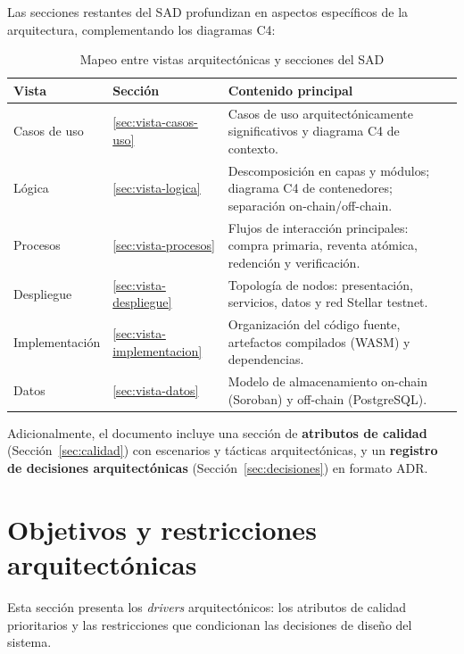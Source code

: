 \documentclass[12pt,oneside]{article}
\begin{document}
Las secciones restantes del SAD profundizan en aspectos específicos de la arquitectura, complementando los diagramas C4:

\begin{table}[htbp]
  \centering
  \begin{tabularx}{\textwidth}{@{}l l X@{}}
    \toprule
    \textbf{Vista} & \textbf{Sección} & \textbf{Contenido principal}\\
    \midrule
    Casos de uso & \ref{sec:vista-casos-uso} & Casos de uso arquitectónicamente significativos y diagrama C4 de contexto.\\
    Lógica & \ref{sec:vista-logica} & Descomposición en capas y módulos; diagrama C4 de contenedores; separación on-chain/off-chain.\\
    Procesos & \ref{sec:vista-procesos} & Flujos de interacción principales: compra primaria, reventa atómica, redención y verificación.\\
    Despliegue & \ref{sec:vista-despliegue} & Topología de nodos: presentación, servicios, datos y red Stellar testnet.\\
    Implementación & \ref{sec:vista-implementacion} & Organización del código fuente, artefactos compilados (WASM) y dependencias.\\
    Datos & \ref{sec:vista-datos} & Modelo de almacenamiento on-chain (Soroban) y off-chain (PostgreSQL).\\
    \bottomrule
  \end{tabularx}
  \caption{Mapeo entre vistas arquitectónicas y secciones del SAD}
  \label{tab:mapeo-vistas}
\end{table}

Adicionalmente, el documento incluye una sección de \textbf{atributos de calidad} (Sección~\ref{sec:calidad}) con escenarios y tácticas arquitectónicas, y un \textbf{registro de decisiones arquitectónicas} (Sección~\ref{sec:decisiones}) en formato ADR.

\FloatBarrier
\clearpage
\section{Objetivos y restricciones arquitectónicas}
\label{sec:objetivos-restricciones}

Esta sección presenta los \textit{drivers} arquitectónicos: los atributos de calidad prioritarios y las restricciones que condicionan las decisiones de diseño del sistema.
\end{document}
